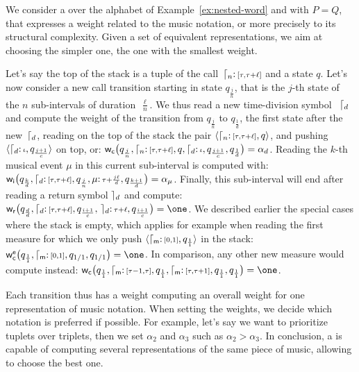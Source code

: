 \begin{example} \label{ex:SWVPA}
We consider a \SWVPA over the alphabet of Example~\ref{ex:nested-word} and with $P = Q$,
that expresses a weight related to the music notation,
or more precisely to its structural complexity.
Given a set of equivalent representations, we aim at choosing the simpler one, \ie the one with the smallest weight.

Let's say the top of the stack is a tuple of the call~$\lceil_{n}\mathpunct{:}{\scriptstyle [\tau, \tau+\ell]}$ and a state $q$. Let's now consider a new call transition starting in state $q_{\frac{j}{n}}$, that is the $j$-th state of the $n$ sub-intervals of duration~$\frac{\ell}{n}$.
We thus read a new time-division symbol ~$\lceil_{d}$ 
and compute the weight of the transition from $q_{\frac{j}{n}}$ to $q_{\frac{1}{d}}$, 
the first state after the new~$\lceil_{d}$, reading on the top of the stack the pair
$\<\ccall{n}\tstamp{[\tau, \tau+\ell]}, q>$, 
and pushing $\<\ccall{d}\tstamp{\iota}, q_{\frac{j+1}{c}}>$ on top, or:
\(
{\mathsf{w}_\mathsf{c}}\bigl(q_{\frac{j}{n}},
           \lceil_{n}\mathpunct{:}{\scriptstyle [\tau, \tau+\ell]}, q,
           \lceil_{d}\mathpunct{:}{\scriptstyle \iota}, q_{\frac{j+1}{c}},
           q_{\frac{1}{d}} \bigr) = \alpha_d
\).
\noindent
Reading the $k$-th musical event $\mu$ in this current sub-interval is computed with:
\(
{\mathsf{w}_\mathsf{i}}\bigl(q_{\frac{k}{d}},
           \lceil_{d}\mathpunct{:}{\scriptstyle [\tau, \tau+\ell]}, q_{\frac{j}{n}},
           \mu\mathpunct{:}{\scriptstyle \tau + \frac{j\ell}{d}}, q_{\frac{k+1}{d}} \bigr) = \alpha_\mu
\).
Finally, this sub-interval will end after reading a return symbol $\rceil_{d}$ and compute:
\(
\weir\bigl(q_{\frac{d}{d}},
           \ccall{d}\tstamp{[\tau, \tau+\ell]}, q_{\frac{i+1}{c}},
           \,\creturn{d}\tstamp{\tau + \ell}, q_{\frac{i+1}{c}} \bigr) = \one
\).
\noindent
We described earlier the special cases where the stack is empty, which applies for example when reading the first measure 
for which we only push $\<\ccall{\mathsf{m}}\tstamp{[0, 1]}, q_{\frac{1}{1}}>$ in the stack:
\(
\weiec\bigl(q_{\frac{1}{1}},
           \ccall{\mathsf{m}}\tstamp{[0, 1]}, q_{1/1},
           q_{1/1} \bigr) = \one
\).
In comparison, any other new measure would compute instead:
\(
\weic\bigl(q_{\frac{1}{1}},
          \ccall{\mathsf{m}}\tstamp{[\tau-1, \tau]}, q_{\frac{1}{1}},
          \ccall{\mathsf{m}}\tstamp{[\tau, \tau+1]}, q_{\frac{1}{1}},
          q_{\frac{1}{1}} \bigr) = \one
\).

Each transition thus has a weight computing an overall weight for one representation of music notation. 
When setting the weights, we decide which notation is preferred if possible. 
For example, let's say we want to prioritize tuplets over triplets, then we set $\alpha_2$ and $\alpha_3$ such as $\alpha_2 > \alpha_3$. In conclusion, a \SWVPA is capable of computing several representations of the same piece of music, allowing to choose the best one.
\endex
\end{example}

